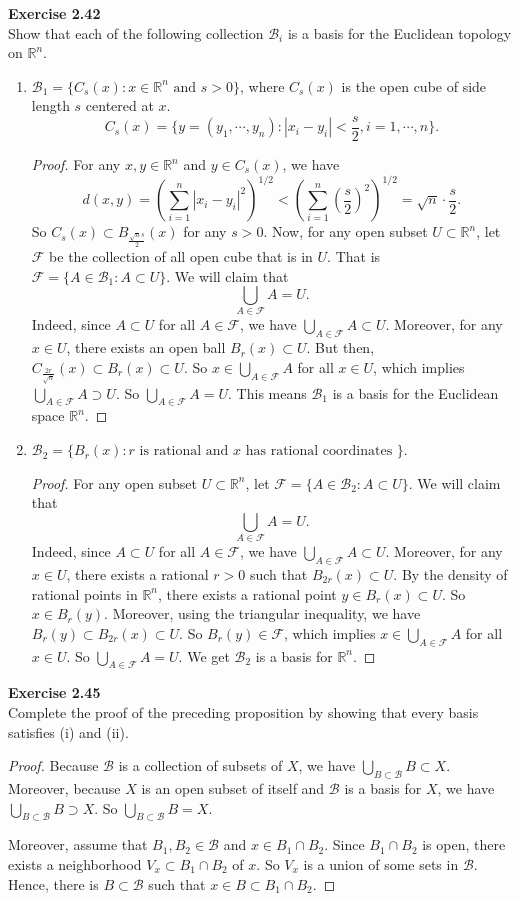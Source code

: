 \documentclass[12pt, a4paper]{article}
\theoremstyle{plain}
\newcommand{\B}{\mathscr{B}}
\newcommand{\R}{\mathbb{R}}
\newcommand{\F}{\mathcal{F}}
\newenvironment{exercise}[2][Exercise]
    { \begin{mdframed}[backgroundcolor=gray!20] \textbf{#1 #2} \\}
    {  \end{mdframed}}
\begin{document}
\begin{exercise}{2.42}
Show that each of the following collection $\B_i$ is a basis for the Euclidean topology on $\R^n$.
\begin{enumerate}
\item $\B_1=\{C_s(x):x\in \R^n \text{ and } s>0\}$, where $C_s(x)$ is the open cube of side length $s$ centered at $x$.
\[
C_s(x)=\{y=(y_1,\cdots,y_n):|x_i-y_i|<\frac{s}{2},i=1,\cdots,n\}.
\]
	\begin{proof}
	For any $x,y\in \R^n$ and $y\in C_s(x)$, we have
	\[
	d(x,y)=\left(\sum_{i=1}^{n}{|x_i-y_i|^2}\right)^{1/2}<\left(\sum_{i=1}^{n}{\left(\frac{s}{2}\right)^2}\right)^{1/2}=\sqrt{n}\cdot \frac{s}{2}.
	\]
	So $C_s(x)\subset B_{\frac{\sqrt{n}s}{2}}(x)$ for any $s>0$. Now, for any open subset $U\subset \R^n$, let $\F$ be the collection of all open cube that is in $U$. That is $\F=\{A\in \B_1:A\subset U\}$. We will claim that 
	\[
	\bigcup_{A\in \F}{A}=U.
	\]
	Indeed, since $A\subset U$ for all $A\in\F$, we have $\bigcup_{A\in \F}{A}\subset U.$ Moreover, for any $x\in U$, there exists an open ball $B_r(x)\subset U$. But then, $C_{\frac{2r}{\sqrt{n}}}(x)\subset B_r(x)\subset U$. So $x\in \bigcup_{A\in \F}{A}$ for all $x\in U$, which implies $\bigcup_{A\in \F}{A}\supset U$. So $\bigcup_{A\in \F}{A}=U$. This means $\B_1$ is a basis for the Euclidean space $\R^n$.
	\end{proof}
\item $\B_2=\{B_r(x):r \text{ is rational and }x\text{ has rational coordinates }\}.$
	\begin{proof}
	For any open subset $U\subset \R^n$, let $\F=\{A\in \B_2:A\subset U\}$. We will claim that
	\[
	\bigcup_{A\in \F}{A}=U.
	\]
	Indeed, since $A\subset U$ for all $A\in\F$, we have $\bigcup_{A\in \F}{A}\subset U.$ Moreover, for any $x\in U$, there exists a rational $r>0$ such that $B_{2r}(x)\subset U$. By the density of rational points in $\R^n$, there exists a rational point $y\in B_{r}(x)\subset U$. So $x\in B_r(y)$. Moreover, using the triangular inequality, we have $B_r(y)\subset B_{2r}(x)\subset U$. So $B_r(y)\in\F$, which implies $x\in \bigcup_{A\in \F}{A}$ for all $x\in U$. So $\bigcup_{A\in \F}{A}=U$. We get $\B_2$ is a basis for $\R^n$.
	\end{proof}
\end{enumerate}
\end{exercise}

\begin{exercise}{2.45}
Complete the proof of the preceding proposition by showing that every basis satisfies (i) and (ii).
\end{exercise}
	\begin{proof}
	Because $\B$ is a collection of subsets of $X$, we have $\bigcup_{B\subset\B}B\subset X$. Moreover, because $X$ is an open subset of itself and $\B$ is a basis for $X$, we have $\bigcup_{B\subset\B}B\supset X$. So $\bigcup_{B\subset\B}B= X$.
	
	Moreover, assume that $B_1,B_2\in\B$ and $x\in B_1\cap B_2$. Since $B_1\cap B_2$ is open, there exists a neighborhood $V_x\subset B_1\cap B_2$ of $x$. So $V_x$ is a union of some sets in $\B$. Hence, there is $B\subset\B$ such that $x\in B\subset B_1\cap B_2$.
	\end{proof}
	
\end{document}
